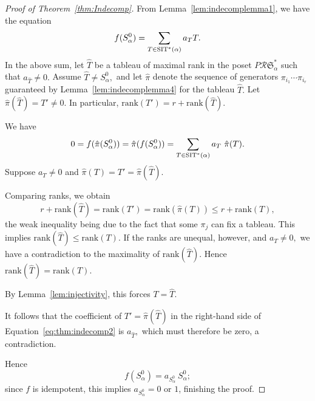 \documentclass[12pt,letterpaper]{amsart}
\theoremstyle{definition}
\newcommand{\rdI}{\mathcal{R}\mathfrak{S}^*}
\begin{document}
\begin{proof}[Proof of Theorem~\ref{thm:Indecomp}] From Lemma~\ref{lem:indecomplemma1}, we have  the equation 
\[f(S^0_\alpha) = \sum_{T\in \operatorname{SIT}^*(\alpha)} a_T T.\]
In the above sum, let $\hat T$ be a tableau of maximal rank in the poset $P\rdI_{\alpha}$ such that $a_{\hat{T}}\ne 0.$ Assume $\hat T\ne S^0_\alpha,$ and let $\hat\pi$ denote the sequence of generators $\pi_{i_1}\cdots \pi_{{i_r}}$  guaranteed by Lemma~\ref{lem:indecomplemma4} for the tableau $\hat T.$ 
 Let $\hat\pi(\hat T)=T'\ne 0.$  In particular, $\mathrm{rank}(T')=r+\mathrm{rank}(\hat T).$
 
We have 
\begin{equation}\label{eq:thm:indecomp2}0=f(\hat\pi(S^0_\alpha))=\hat\pi(f(S^0_\alpha))
 =\sum_{T\in \operatorname{SIT}^*(\alpha)} a_T\ \hat\pi(T).\end{equation}
 Suppose $a_T\ne 0$  and $\hat\pi(T)=T'=\hat\pi(\hat T).$ 

 Comparing ranks, we obtain \[r+\mathrm{rank}(\hat T)=\mathrm{rank}(T')=\mathrm{rank}(\hat\pi( T))\le r+\mathrm{rank}(T),\]
 the weak inequality being due to the fact that some $\pi_{j}$ can fix a tableau.
 This implies $\mathrm{rank}(\hat T)\le \mathrm{rank}( T).$ 
 If the ranks are unequal, however, and $a_T\ne 0,$ we have a contradiction to the maximality of $\mathrm{rank}(\hat T).$ 
 Hence $\mathrm{rank}(\hat T)= \mathrm{rank}( T).$ 
 
By Lemma~\ref{lem:injectivity}, this forces  $T=\hat T.$ 

 It follows that the coefficient of $T'=\hat\pi(\hat T)$ in the right-hand side of  Equation~\eqref{eq:thm:indecomp2} is $a_{\hat T},$ which must therefore be zero, a contradiction.

 Hence \[f(S^0_\alpha)= a_{S^0_\alpha}\ S^0_\alpha;\]
 since $f$ is idempotent, this implies $a_{S^0_\alpha}=0 \text{ or } 1$, finishing the proof.
\end{proof}
\end{document}
